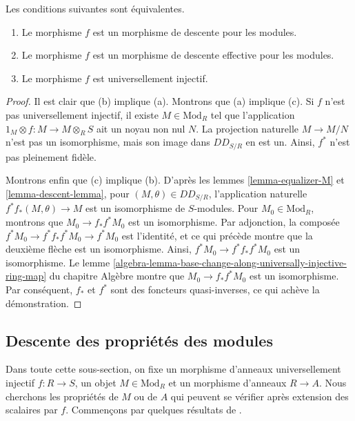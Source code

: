 \begin{theorem}
\label{theorem-descent}
Les conditions suivantes sont équivalentes.
\begin{enumerate}
\item[(a)] Le morphisme $f$ est un morphisme de descente pour les modules.
\item[(b)] Le morphisme $f$ est un morphisme de descente effective pour les modules.
\item[(c)] Le morphisme $f$ est universellement injectif.
\end{enumerate}
\end{theorem}

\begin{proof}
Il est clair que (b) implique (a). Montrons que (a) implique (c).
Si $f$ n'est pas universellement injectif, il existe
$M \in \text{Mod}_R$ tel que l'application
$1_M \otimes f: M \to M \otimes_R S$ ait un noyau non nul $N$.
La projection naturelle $M \to M/N$ n'est pas un isomorphisme,
mais son image dans $DD_{S/R}$ en est un.
Ainsi, $f^*$ n'est pas pleinement fidèle.

\medskip\noindent
Montrons enfin que (c) implique (b). D'après les lemmes
\ref{lemma-equalizer-M} et \ref{lemma-descent-lemma}, pour
$(M, \theta) \in DD_{S/R}$, l'application naturelle
$f^* f_*(M,\theta) \to M$ est un isomorphisme de $S$-modules.
Pour $M_0 \in \text{Mod}_R$, montrons que $M_0 \to f_*f^*M_0$
est un isomorphisme. Par adjonction, la composée
$f^*M_0 \to f^*f_*f^*M_0 \to f^*M_0$ est l'identité, et ce qui précède
montre que la deuxième flèche est un isomorphisme. Ainsi,
$f^*M_0 \to f^*f_*f^*M_0$ est un isomorphisme. Le lemme
\ref{algebra-lemma-base-change-along-universally-injective-ring-map}
du chapitre Algèbre montre que $M_0 \to f_* f^* M_0$ est un isomorphisme.
Par conséquent, $f_*$ et $f^*$ sont des foncteurs quasi-inverses,
ce qui achève la démonstration.
\end{proof}

\subsection{Descente des propriétés des modules}
\label{subsection-descent-properties-modules}

\noindent
Dans toute cette sous-section, on fixe un morphisme d'anneaux
universellement injectif $f : R \to S$, un objet $M \in \text{Mod}_R$
et un morphisme d'anneaux $R \to A$. Nous cherchons les propriétés de
$M$ ou de $A$ qui peuvent se vérifier après extension des scalaires
par $f$. Commençons par quelques résultats de \cite{mesablishvili2}.

